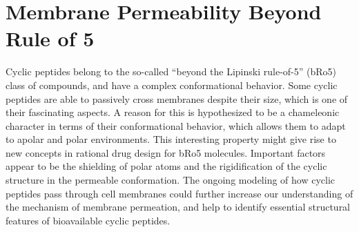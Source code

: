 
\section{Membrane Permeability Beyond Rule of 5}
Cyclic peptides belong to the so-called ``beyond the Lipinski rule-of-5'' (bRo5) class of compounds, and have a complex conformational behavior. Some cyclic peptides are able to passively cross membranes despite their size, which is one of their fascinating aspects.\cite{Rezai2006, Rezai2006A, Matsson2017,Whitty2016} 
A reason for this is hypothesized to be a chameleonic character in terms of their conformational behavior, which allows them to adapt to apolar and polar environments.\cite{Witek2016, Witek2017, Witek2019, Wang2021} This interesting property might give rise to new concepts in rational drug design for bRo5 molecules.
Important factors appear to be the shielding of polar atoms and the rigidification of the cyclic structure in the permeable conformation.\cite{Witek2019, Wang2021} 
The ongoing modeling of how cyclic peptides pass through cell membranes could further increase our understanding of the mechanism of membrane permeation, and help to identify essential structural features of bioavailable cyclic peptides.



